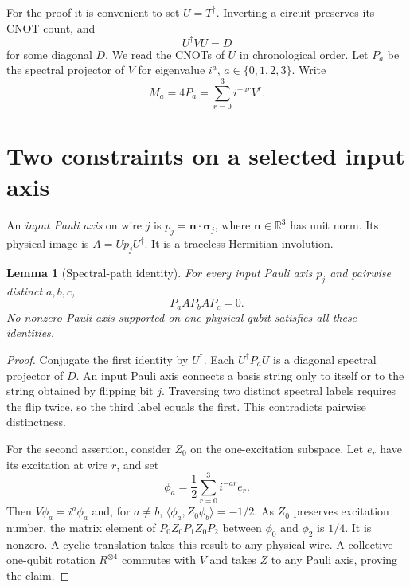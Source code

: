 \documentclass[11pt]{article}
\newtheorem{lemma}{Lemma}
\begin{document}
For the proof it is convenient to set $U=T^\dagger$.  Inverting a circuit
preserves its CNOT count, and
\begin{equation}\label{eq:diagonal}
U^\dagger VU=D
\end{equation}
for some diagonal $D$.  We read the CNOTs of $U$ in chronological order.
Let $P_a$ be the spectral projector of $V$ for eigenvalue $i^a$,
$a\in\{0,1,2,3\}$.  Write
\begin{equation}\label{eq:projector}
M_a=4P_a=\sum_{r=0}^{3}i^{-ar}V^r.
\end{equation}

\section{Two constraints on a selected input axis}

An \emph{input Pauli axis} on wire $j$ is
$p_j=\mathbf n\cdot\boldsymbol\sigma_j$, where
$\mathbf n\in\mathbb R^3$ has unit norm.  Its physical image is
$A=Up_jU^\dagger$.  It is a traceless Hermitian involution.

\begin{lemma}[Spectral-path identity]\label{lem:path}
For every input Pauli axis $p_j$ and pairwise distinct $a,b,c$,
\begin{equation}\label{eq:path}
P_a A P_b A P_c=0.
\end{equation}
No nonzero Pauli axis supported on one physical qubit satisfies all these
identities.
\end{lemma}

\begin{proof}
Conjugate the first identity by $U^\dagger$.  Each $U^\dagger P_aU$ is a
diagonal spectral projector of $D$.  An input Pauli axis connects a basis
string only to itself or to the string obtained by flipping bit $j$.
Traversing two distinct spectral labels requires the flip twice, so the
third label equals the first.  This contradicts pairwise distinctness.

For the second assertion, consider $Z_0$ on the one-excitation subspace.
Let $e_r$ have its excitation at wire $r$, and set
\begin{equation}\label{eq:fourier}
\phi_a=\frac12\sum_{r=0}^{3}i^{-ar}e_r.
\end{equation}
Then $V\phi_a=i^a\phi_a$ and, for $a\ne b$,
$\langle\phi_a,Z_0\phi_b\rangle=-1/2$.  As $Z_0$ preserves excitation
number, the matrix element of $P_0Z_0P_1Z_0P_2$ between $\phi_0$ and
$\phi_2$ is $1/4$.  It is nonzero.  A cyclic translation takes this result
to any physical wire.  A collective one-qubit rotation $R^{\otimes4}$
commutes with $V$ and takes $Z$ to any Pauli axis, proving the claim.
\end{proof}
\end{document}
